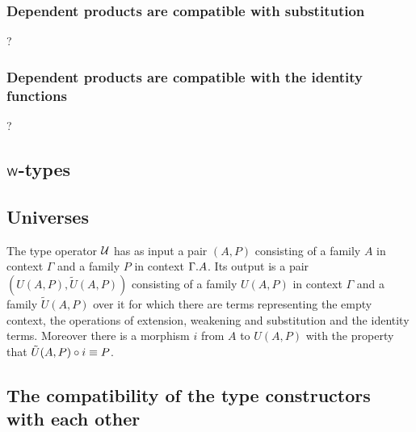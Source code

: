 \subsubsection{Dependent products are compatible with substitution}?
\subsubsection{Dependent products are compatible with the identity functions}?

\subsection{${\mathsf{W}}$-types}

\subsection{Universes}\label{universes}
The type operator $\mathcal{U}$ has as input a pair $(A,P)$ consisting of a family
$A$ in context $\Gamma$ and a family $P$ in context $\ctxext{\Gamma}{A}$. Its
output is a pair $(U(A,P),\tilde{U}(A,P))$ consisting of a family
$U(A,P)$ in context $\Gamma$ and a family $\tilde{U}(A,P)$ over it for which
there are terms representing the empty context, the operations of extension,
weakening and substitution and the identity terms. Moreover there is a morphism
$i$ from $A$ to $U(A,P)$ with the property that 
$\jcomp{}{i}{\tilde{U}(A,P)}\jdeq P$.

\subsection{The compatibility of the type constructors with each other}
\label{compatibility-of-type-constructors}
